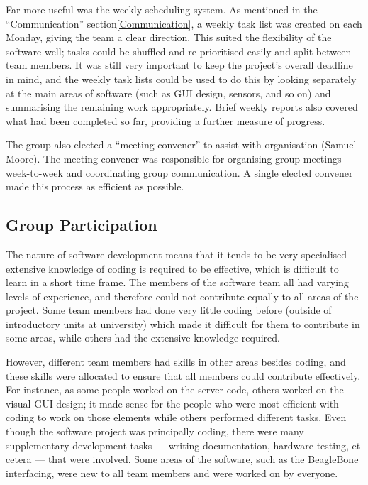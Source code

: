Far more useful was the weekly scheduling system. As mentioned in the ``Communication'' section\ref{Communication}, a weekly task list was created on each Monday, giving the team a clear direction. This suited the flexibility of the software well; tasks could be shuffled and re-prioritised easily and split between team members. It was still very important to keep the project's overall deadline in mind, and the weekly task lists could be used to do this by looking separately at the main areas of software (such as GUI design, sensors, and so on) and summarising the remaining work appropriately. Brief weekly reports also covered what had been completed so far, providing a further measure of progress.


The group also elected a ``meeting convener'' to assist with organisation (Samuel Moore). The meeting convener was responsible for organising group meetings week-to-week and coordinating group communication. A single elected convener made this process as efficient as possible.

\subsection{Group Participation}

The nature of software development means that it tends to be very specialised --- extensive knowledge of coding is required to be effective, which is difficult to learn in a short time frame. The members of the software team all had varying levels of experience, and therefore could not contribute equally to all areas of the project. Some team members had done very little coding before (outside of introductory units at university) which made it difficult for them to contribute in some areas, while others had the extensive knowledge required.


However, different team members had skills in other areas besides coding, and these skills were allocated to ensure that all members could contribute effectively. For instance, as some people worked on the server code, others worked on the visual GUI design; it made sense for the people who were most efficient with coding to work on those elements while others performed different tasks. Even though the software project was principally coding, there were many supplementary development tasks --- writing documentation, hardware testing, et cetera --- that were involved. Some areas of the software, such as the BeagleBone interfacing, were new to all team members and were worked on by everyone.


